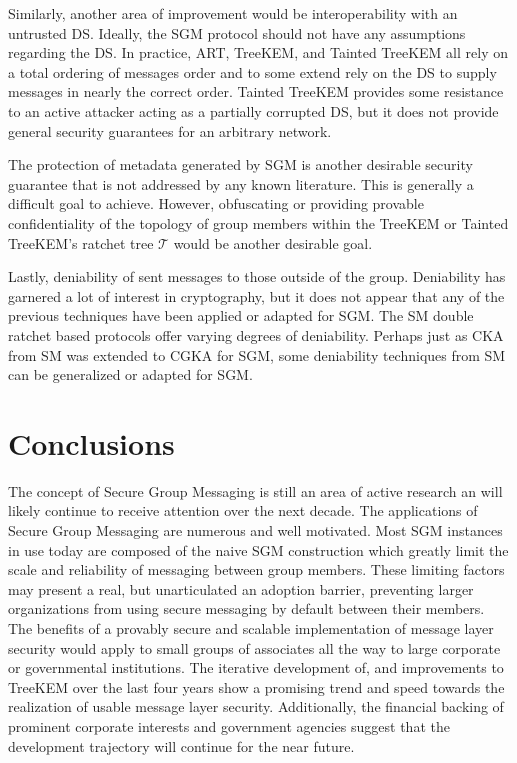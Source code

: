 \documentclass[12pt,twocolumn]{article}
\begin{document}
	Similarly, another area of improvement would be interoperability with an untrusted DS.
	Ideally, the SGM protocol should not have any assumptions regarding the DS.
	In practice, ART, TreeKEM, and Tainted TreeKEM all rely on a total ordering of messages order and to some extend rely on the DS to supply messages in nearly the correct order.
	Tainted TreeKEM provides some resistance to an active attacker acting as a partially corrupted DS, but it does not provide general security guarantees for an arbitrary network. 

	The protection of metadata generated by SGM is another desirable security guarantee that is not addressed by any known literature.
	This is generally a difficult goal to achieve.
	However, obfuscating or providing provable confidentiality of the topology of group members within the TreeKEM or Tainted TreeKEM's ratchet tree $\mathcal{T}$ would be another desirable goal.
	
	Lastly, deniability of sent messages to those outside of the group.
	Deniability has garnered a lot of interest in cryptography, but it does not appear that any of the previous techniques have been applied or adapted for SGM.
	The SM double ratchet based protocols offer varying degrees of deniability.
	Perhaps just as CKA from SM was extended to CGKA for SGM, some deniability techniques from SM can be generalized or adapted for SGM.
	
	\vspace*{5em}
	\section*{Conclusions}
	
	The concept of Secure Group Messaging is still an area of active research an will likely continue to receive attention over the next decade.
	The applications of Secure Group Messaging are numerous and well motivated.
	Most SGM instances in use today are composed of the naive SGM construction which greatly limit the scale and reliability of messaging between group members.
	These limiting factors may present a real, but unarticulated an adoption barrier, preventing larger organizations from using secure messaging by default between their members.
	The benefits of a provably secure and scalable implementation of message layer security would apply to small groups of associates all the way to large corporate or governmental institutions.
	The iterative development of, and improvements to TreeKEM over the last four years show a promising trend and speed towards the realization of usable message layer security.
	Additionally, the financial backing of prominent corporate interests and government agencies suggest that the development trajectory will continue for the near future.
	
\end{document}
